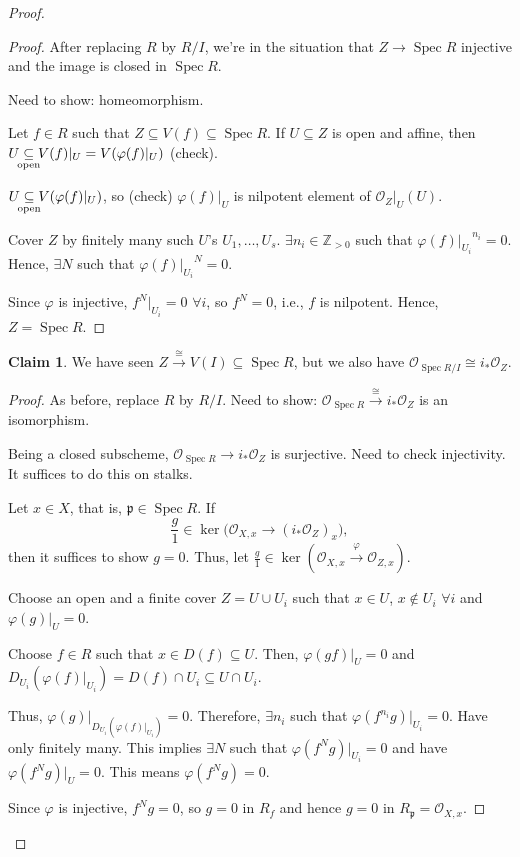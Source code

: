 \documentclass[12pt]{article}
\DeclareMathOperator{\Spec}{Spec}
\theoremstyle{definition}
\newtheorem{claim+}{Claim}
\begin{document}
\begin{proof}
\begin{proof}
After replacing $R$ by $R/I$, we're in the situation that $Z\rightarrow\Spec R$ injective and the image is closed in $\Spec R$.

Need to show: homeomorphism.

Let $f\in R$ such that $Z\subseteq V(f)\subseteq\Spec R$. If $U\subseteq Z$ is open and affine, then $U\underset{\mathclap{\text{open}}}\subseteq V(f)|_U=V(\varphi(f)|_U)$ (check).

$U\underset{\mathclap{\text{open}}}\subseteq V(\varphi(f)|_U)$, so (check) $\varphi(f)|_U$ is nilpotent element of $\mathcal O_Z|_U(U)$.

Cover $Z$ by finitely many such $U$'s $U_1,\ldots,U_s$. $\exists n_i\in\mathbb Z_{>0}$ such that ${\varphi(f)|_{U_i}}^{n_i}=0$. Hence, $\exists N$ such that ${\varphi(f)|_{U_i}}^N=0$.

Since $\varphi$ is injective, $f^N|_{U_i}=0$ $\forall i$, so $f^N=0$, i.e., $f$ is nilpotent. Hence, $Z=\Spec R$.
\end{proof}

\begin{claim+}
We have seen $Z\xrightarrow\cong V(I)\subseteq\Spec R$, but we also have $\mathcal O_{\Spec R/I}\cong i_*\mathcal O_Z$.
\end{claim+}

\begin{proof}
As before, replace $R$ by $R/I$. Need to show: $\mathcal O_{\Spec R}\xrightarrow\cong i_*\mathcal O_Z$ is an isomorphism.

Being a closed subscheme, $\mathcal O_{\Spec R}\rightarrow i_*\mathcal O_Z$ is surjective. Need to check injectivity. It suffices to do this on stalks.

Let $x\in X$, that is, $\mathfrak p\in\Spec R$. If
\[\frac g1\in\ker\big(\mathcal O_{X,x}\longrightarrow(i_*\mathcal O_Z)_x\big),\]
then it suffices to show $g=0$. Thus, let $\frac g1\in\ker(\mathcal O_{X,x}\xrightarrow\varphi\mathcal O_{Z,x})$.

Choose an open and a finite cover $Z=U\cup U_i$ such that $x\in U$, $x\notin U_i$ $\forall i$ and $\varphi(g)|_U=0$.

Choose $f\in R$ such that $x\in D(f)\subseteq U$. Then, $\varphi(gf)|_U=0$ and $D_{U_i}(\varphi(f)|_{U_i})=D(f)\cap U_i\subseteq U\cap U_i$.

Thus, $\varphi(g)|_{D_{U_i}(\varphi(f)|_{U_i})}=0$. Therefore, $\exists n_i$ such that $\varphi(f^{n_i}g)|_{U_i}=0$. Have only finitely many. This implies $\exists N$ such that $\varphi(f^Ng)|_{U_i}=0$ and have $\varphi(f^Ng)|_U=0$. This means $\varphi(f^Ng)=0$.

Since $\varphi$ is injective, $f^Ng=0$, so $g=0$ in $R_f$ and hence $g=0$ in $R_\mathfrak p=\mathcal O_{X,x}$.
\end{proof}
\end{proof}
\end{document}
